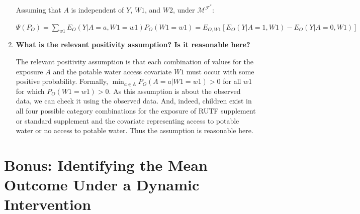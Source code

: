 \documentclass{article}\usepackage[]{graphicx}\usepackage[]{xcolor}
\begin{document}
\begin{enumerate}[label=\textbf{\alph*.}]
    Assuming that $A$ is independent of $Y$, $W1$, and $W2$, under $\mathcal{M}^{\mathcal{F}^*}$:
    
    $\Psi(P_O) = \sum_{w1} E_O(Y | A = a, W1 = w1) P_O(W1 = w1) = E_{O,W1}[E_O(Y|A=1,W1) - E_O(Y|A=0,W1)]$
    
    \item \textbf{What is the relevant positivity assumption? Is it reasonable here?}
    
    The relevant positivity assumption is that each combination of values for the exposure $A$ and the potable water access covariate $W1$ must occur with some positive probability. Formally, $\min_{a \in \mathbb{A}} P_O(A=a|W1=w1)>0$ for all $w1$ for which $P_O(W1=w1)>0$. As this assumption is about the observed data, we can check it using the observed data. And, indeed, children exist in all four possible category combinations for the exposure of RUTF supplement or standard supplement and the covariate representing access to potable water or no access to potable water. Thus the assumption is reasonable here.
  
  \end{enumerate}
  
\pagebreak

\section{Bonus: Identifying the Mean Outcome Under a Dynamic Intervention}
\end{document}
